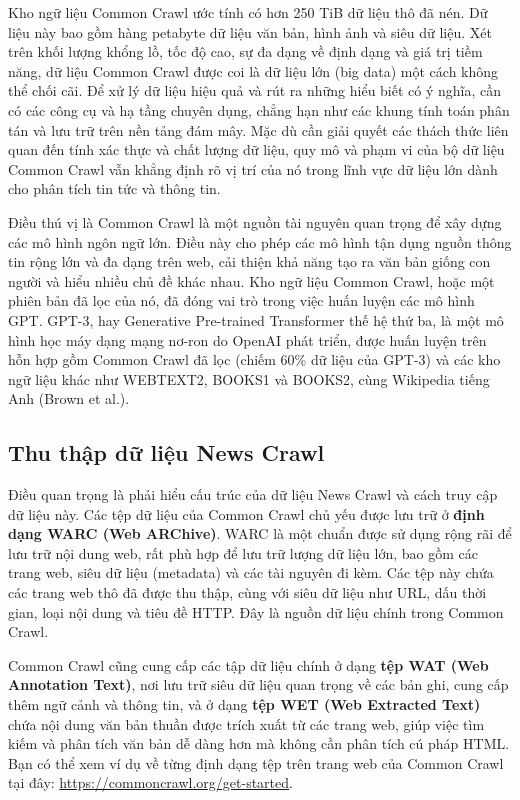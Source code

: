 Kho ngữ liệu Common Crawl ước tính có hơn 250 TiB dữ liệu thô đã nén. Dữ liệu này bao gồm hàng petabyte dữ liệu văn bản, hình ảnh và siêu dữ liệu. Xét trên khối lượng khổng lồ, tốc độ cao, sự đa dạng về định dạng và giá trị tiềm năng, dữ liệu Common Crawl được coi là dữ liệu lớn (big data) một cách không thể chối cãi. Để xử lý dữ liệu hiệu quả và rút ra những hiểu biết có ý nghĩa, cần có các công cụ và hạ tầng chuyên dụng, chẳng hạn như các khung tính toán phân tán và lưu trữ trên nền tảng đám mây. Mặc dù cần giải quyết các thách thức liên quan đến tính xác thực và chất lượng dữ liệu, quy mô và phạm vi của bộ dữ liệu Common Crawl vẫn khẳng định rõ vị trí của nó trong lĩnh vực dữ liệu lớn dành cho phân tích tin tức và thông tin.

Điều thú vị là Common Crawl là một nguồn tài nguyên quan trọng để xây dựng các mô hình ngôn ngữ lớn. Điều này cho phép các mô hình tận dụng nguồn thông tin rộng lớn và đa dạng trên web, cải thiện khả năng tạo ra văn bản giống con người và hiểu nhiều chủ đề khác nhau. Kho ngữ liệu Common Crawl, hoặc một phiên bản đã lọc của nó, đã đóng vai trò trong việc huấn luyện các mô hình GPT. GPT-3, hay Generative Pre-trained Transformer thế hệ thứ ba, là một mô hình học máy dạng mạng nơ-ron do OpenAI phát triển, được huấn luyện trên hỗn hợp gồm Common Crawl đã lọc (chiếm 60\% dữ liệu của GPT-3) và các kho ngữ liệu khác như WEBTEXT2, BOOKS1 và BOOKS2, cùng Wikipedia tiếng Anh (Brown et al.).

\subsection{Thu thập dữ liệu News Crawl}

Điều quan trọng là phải hiểu cấu trúc của dữ liệu News Crawl và cách truy cập dữ liệu này. Các tệp dữ liệu của Common Crawl chủ yếu được lưu trữ ở \textbf{định dạng WARC (Web ARChive)}. WARC là một chuẩn được sử dụng rộng rãi để lưu trữ nội dung web, rất phù hợp để lưu trữ lượng dữ liệu lớn, bao gồm các trang web, siêu dữ liệu (metadata) và các tài nguyên đi kèm. Các tệp này chứa các trang web thô đã được thu thập, cùng với siêu dữ liệu như URL, dấu thời gian, loại nội dung và tiêu đề HTTP. Đây là nguồn dữ liệu chính trong Common Crawl.

Common Crawl cũng cung cấp các tập dữ liệu chính ở dạng \textbf{tệp WAT (Web Annotation Text)}, nơi lưu trữ siêu dữ liệu quan trọng về các bản ghi, cung cấp thêm ngữ cảnh và thông tin, và ở dạng \textbf{tệp WET (Web Extracted Text)} chứa nội dung văn bản thuần được trích xuất từ các trang web, giúp việc tìm kiếm và phân tích văn bản dễ dàng hơn mà không cần phân tích cú pháp HTML. Bạn có thể xem ví dụ về từng định dạng tệp trên trang web của Common Crawl tại đây: \url{https://commoncrawl.org/get-started}.

